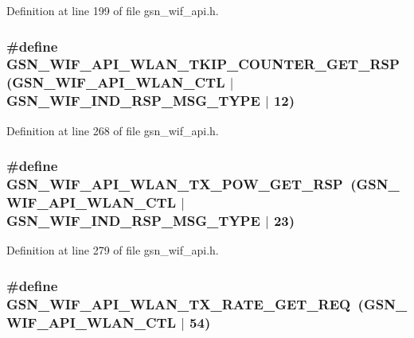 Definition at line 199 of file gsn\_\-wif\_\-api.h.

\hypertarget{a00606_a2badca9f3116f476a7c0a4e70540ddda}{
\subsubsection[{GSN\_\-WIF\_\-API\_\-WLAN\_\-TKIP\_\-COUNTER\_\-GET\_\-RSP}]{\setlength{\rightskip}{0pt plus 5cm}\#define GSN\_\-WIF\_\-API\_\-WLAN\_\-TKIP\_\-COUNTER\_\-GET\_\-RSP~(GSN\_\-WIF\_\-API\_\-WLAN\_\-CTL $|$ GSN\_\-WIF\_\-IND\_\-RSP\_\-MSG\_\-TYPE $|$ 12)}}
\label{a00606_a2badca9f3116f476a7c0a4e70540ddda}


Definition at line 268 of file gsn\_\-wif\_\-api.h.

\hypertarget{a00606_ade1455cde90120f07f6ce732f8f4edef}{
\subsubsection[{GSN\_\-WIF\_\-API\_\-WLAN\_\-TX\_\-POW\_\-GET\_\-RSP}]{\setlength{\rightskip}{0pt plus 5cm}\#define GSN\_\-WIF\_\-API\_\-WLAN\_\-TX\_\-POW\_\-GET\_\-RSP~(GSN\_\-WIF\_\-API\_\-WLAN\_\-CTL $|$ GSN\_\-WIF\_\-IND\_\-RSP\_\-MSG\_\-TYPE $|$ 23)}}
\label{a00606_ade1455cde90120f07f6ce732f8f4edef}


Definition at line 279 of file gsn\_\-wif\_\-api.h.

\hypertarget{a00606_a1a64e2f0126971b7cb99d8449d403264}{
\subsubsection[{GSN\_\-WIF\_\-API\_\-WLAN\_\-TX\_\-RATE\_\-GET\_\-REQ}]{\setlength{\rightskip}{0pt plus 5cm}\#define GSN\_\-WIF\_\-API\_\-WLAN\_\-TX\_\-RATE\_\-GET\_\-REQ~(GSN\_\-WIF\_\-API\_\-WLAN\_\-CTL $|$ 54)}}
\label{a00606_a1a64e2f0126971b7cb99d8449d403264}


